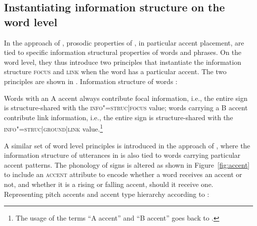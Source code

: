 \documentclass[output=paper
 	        ,biblatex
                ,babelshorthands
                ,newtxmath
                ,draftmode
                ,colorlinks, citecolor=brown
]{langscibook}
\begin{document}
\subsection{Instantiating information structure on the word level}
\label{sec:instant}

In the approach of \cite{EV96a}, prosodic properties of
, in particular accent placement, are tied to specific information
structural properties of words and phrases. On the word level, they
thus introduce two principles that instantiate the information
structure \textsc{focus} and \textsc{link} when the word has a
particular accent. The two principles are shown in
.
\ea
Information structure of words \citep[56]{EV96a}:\\

  \label{fig:engdahl-word-principle}
\z
Words with an A accent always contribute focal information, i.e., the
entire sign is structure-shared with the \textsc{info"=struc|focus}
value; words carrying a B accent contribute link information, i.e., the
entire sign is structure-shared with the
\textsc{info"=struc|ground|link} value.\footnote{The usage of the terms ``A accent'' and ``B accent'' goes back to \cite{Jackendoff72a-u}.}

A similar set of word level principles is introduced in the approach
of \citet{deKuthy2002a}, where the information structure of utterances
in  is also tied to words carrying particular accent patterns.
The phonology of signs is altered as shown in Figure~\ref{fig:accent}
to include an \textsc{accent} attribute to encode whether a word
receives an accent or not, and whether it is a rising or falling
accent, should it receive one.
\ea
Representing pitch accents and accent type hierarchy according to \citet[166]{deKuthy2002a}:\\

\unskip
    \label{fig:accent}
\z
\end{document}
